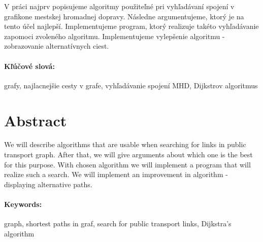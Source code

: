 \documentclass[12pt, oneside]{book}
\begin{document}
V práci najprv popisujeme algoritmy použiteľné pri vyhľadávaní spojení v grafikone mestskej hromadnej dopravy. Následne argumentujeme, ktorý je na tento účel najlepší. Implementujeme program, ktorý realizuje takéto vyhľadávanie zapomoci zvoleného algoritmu. Implementujeme vylepšenie algoritmu - zobrazovanie alternatívnych ciest.

\paragraph*{Kľúčové slová:} grafy, najlacnejšie cesty v grafe, vyhľadávanie spojení MHD, Dijkstrov algoritmus


\newpage 
\section*{Abstract}


We will describe algorithms that are usable when searching for links in public transport graph. After that, we will give arguments about which one is the best for this purpose. With chosen algorithm we will implement a program that will realize such a search. We will implement an improvement in algorithm - displaying alternative paths.


\paragraph*{Keywords:}  graph, shortest paths in graf, search for public transport links, Dijkstra's algorithm


%
%



\newpage 

\tableofcontents
\end{document}
